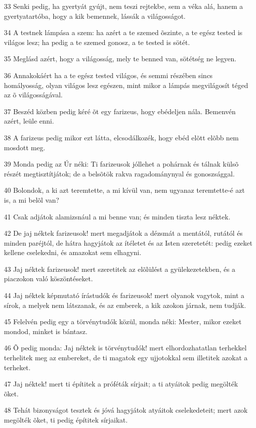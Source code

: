 \par 33 Senki pedig, ha gyertyát gyújt, nem teszi rejtekbe, sem a véka alá, hanem a gyertyatartóba, hogy a kik bemennek, lássák a világosságot.
\par 34 A testnek lámpása a szem: ha azért a te szemed õszinte, a te egész tested is világos lesz; ha pedig a te szemed gonosz, a te tested is sötét.
\par 35 Meglásd azért, hogy a világosság, mely te benned van, sötétség ne legyen.
\par 36 Annakokáért ha a te egész tested világos, és semmi részében sincs homályosság, olyan világos lesz egészen, mint mikor a lámpás megvilágosít téged az õ világosságával.
\par 37 Beszéd közben pedig kéré õt egy farizeus, hogy ebédeljen nála. Bemenvén azért, leüle enni.
\par 38 A farizeus pedig mikor ezt látta, elcsodálkozék, hogy ebéd elõtt elõbb nem mosdott meg.
\par 39 Monda pedig az Úr néki: Ti farizeusok jóllehet a pohárnak és tálnak külsõ részét megtisztítjátok; de a belsõtök rakva ragadománynyal és gonoszsággal.
\par 40 Bolondok, a ki azt teremtette, a mi kívül van, nem ugyanaz teremtette-é azt is, a mi belõl van?
\par 41 Csak adjátok alamizsnául a mi benne van; és minden tiszta lesz néktek.
\par 42 De jaj néktek farizeusok! mert megadjátok a dézsmát a mentától, rutától és minden paréjtól, de hátra hagyjátok az ítéletet és az Isten szeretetét: pedig ezeket kellene cselekedni, és amazokat sem elhagyni.
\par 43 Jaj néktek farizeusok! mert szeretitek az elõlülést a gyülekezetekben, és a piaczokon való köszöntéseket.
\par 44 Jaj néktek képmutató írástudók és farizeusok! mert olyanok vagytok, mint a sírok, a melyek nem látszanak, és az emberek, a kik azokon járnak, nem tudják.
\par 45 Felelvén pedig egy a törvénytudók közül, monda néki: Mester, mikor ezeket mondod, minket is bántasz.
\par 46 Õ pedig monda: Jaj néktek is törvénytudók! mert elhordozhatatlan terhekkel terhelitek meg az embereket, de ti magatok egy ujjotokkal sem illetitek azokat a terheket.
\par 47 Jaj néktek! mert ti építitek a próféták sírjait; a ti atyáitok pedig megölték õket.
\par 48 Tehát bizonyságot tesztek és jóvá hagyjátok atyáitok cselekedeteit; mert azok megölték õket, ti pedig építitek sírjaikat.
